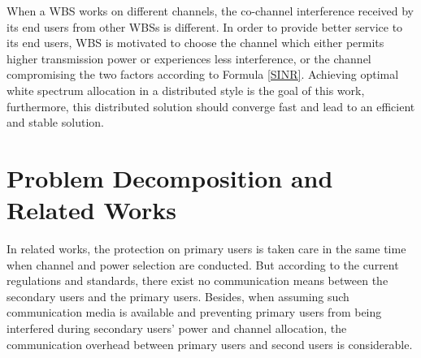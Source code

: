 \documentclass[times]{ettauth}
\theoremstyle{mytheoremstyle}
\theoremstyle{mytheoremstyle}
\theoremstyle{mytheoremstyle}
\begin{document}
When a WBS works on different channels, the co-channel interference received by its end users from other WBSs is different.
In order to provide better service to its end users, WBS is motivated to choose the channel which either permits higher transmission power or experiences less interference, or the channel compromising the two factors according to Formula \ref{SINR}.
Achieving optimal white spectrum allocation in a distributed style is the goal of this work, furthermore, this distributed solution should converge fast and lead to an efficient and stable solution.


\section{Problem Decomposition and Related Works}
\label{decomposition_relatedwork}
In related works, the protection on primary users is taken care in the same time when channel and power selection are conducted.
But according to the current regulations and standards, there exist no communication means between the secondary users and the primary users.
Besides, when assuming such communication media is available and preventing primary users from being interfered during secondary users' power and channel allocation, the communication overhead between primary users and second users is considerable.
\end{document}
